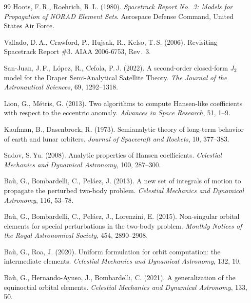 \documentclass[11pt]{article}
\begin{document}
\begin{thebibliography}{99}
Hoots, F.\,R., Roehrich, R.\,L. (1980).
\textit{Spacetrack Report No.~3: Models for Propagation of NORAD Element
Sets}.
Aerospace Defense Command, United States Air Force.

Vallado, D.\,A., Crawford, P., Hujsak, R., Kelso, T.\,S. (2006).
Revisiting Spacetrack Report \#3.
AIAA 2006-6753, Rev.~3.


San-Juan, J.\,F., L\'opez, R., Cefola, P.\,J. (2022).
A second-order closed-form $J_2$ model for the Draper
Semi-Analytical Satellite Theory.
\textit{The Journal of the Astronautical Sciences}, 69, 1292--1318.

Lion, G., M\'etris, G. (2013).
Two algorithms to compute Hansen-like coefficients with respect to the
eccentric anomaly.
\textit{Advances in Space Research}, 51, 1--9.

Kaufman, B., Dasenbrock, R. (1973).
Semianalytic theory of long-term behavior of earth and lunar orbiters.
\textit{Journal of Spacecraft and Rockets}, 10, 377--383.


Sadov, S.\,Yu. (2008).
Analytic properties of Hansen coefficients.
\textit{Celestial Mechanics and Dynamical Astronomy}, 100, 287--300.


Ba\`u, G., Bombardelli, C., Pel\'aez, J. (2013).
A new set of integrals of motion to propagate the perturbed two-body
problem.
\textit{Celestial Mechanics and Dynamical Astronomy}, 116, 53--78.

Ba\`u, G., Bombardelli, C., Pel\'aez, J., Lorenzini, E. (2015).
Non-singular orbital elements for special perturbations in the two-body
problem.
\textit{Monthly Notices of the Royal Astronomical Society}, 454,
2890--2908.

Ba\`u, G., Roa, J. (2020).
Uniform formulation for orbit computation: the intermediate elements.
\textit{Celestial Mechanics and Dynamical Astronomy}, 132, 10.

Ba\`u, G., Hernando-Ayuso, J., Bombardelli, C. (2021).
A generalization of the equinoctial orbital elements.
\textit{Celestial Mechanics and Dynamical Astronomy}, 133, 50.



\end{thebibliography}
\end{document}
